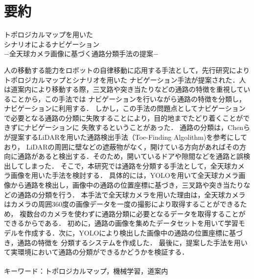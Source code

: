 \documentclass[../main]{subfiles}
\begin{document}
 \chapter*{要約}
 \begin{center}
    {\LARGE トポロジカルマップを用いた\\シナリオによるナビゲーション\\
    \vspace{0.5cm}
    −全天球カメラ画像に基づく通路分類手法の提案−}\\
 \end{center}\vspace{0.8cm}


    人の移動する能力をロボットの自律移動に応用する手法として，先行研究によりトポロジカルマップとシナリオを用いた
    ナビゲーション手法が提案された．人は道案内により移動する際，三叉路や突き当たりなどの通路の特徴を重視していることから，この手法では
    ナビゲーションを行いながら通路の特徴を分類し，ナビゲーションに利用する．
    しかし，この手法の問題点としてナビゲーションで必要となる通路の分類に失敗することにより，目的地までたどり着くことができずにナビゲーションに
    失敗するということがあった．
    通路の分類は，Chenらが提案するLiDARを用いた通路検出手法（Toe-Finding Algolithm)\cite{toe-finding_paper}を参考にしており，
    LiDARの周囲に壁などの遮蔽物がなく，開けている方向があればその方向に通路があると検出する．そのため，開いているドアや隙間などを通路と誤検出してしまった．
    そこで，本研究では通路を分類する手法として，全天球カメラ画像を用いた手法を検討する．
    具体的には，YOLOを用いて全天球カメラ画像から通路を検出し，画像中の通路の位置座標に基づき，三叉路や突き当たりなどの通路の分類を行う．
    本手法で全天球カメラを用いた理由は，全天球カメラはカメラの周囲360度の画像データを一度の撮影により取得することができるため，
    複数台のカメラを使わずに通路分類に必要となるデータを取得することができるからである．
    初めに，通路の画像を集めたデータセットを用いて学習モデルを作成する．次に，YOLOにより検出した画像中の通路の位置座標に基づき，通路の特徴を
    分類するシステムを作成した．
    最後に，提案した手法を用いて実環境において通路の分類ができるかどうかを検証する．\\\\

    キーワード：トポロジカルマップ，機械学習，道案内
\end{document}
